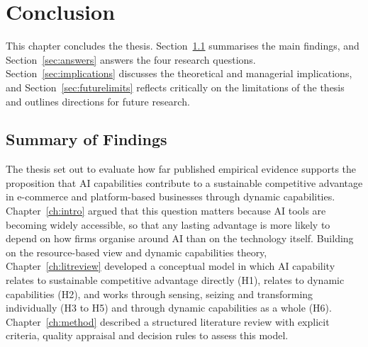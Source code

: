 %

\chapter{Conclusion}
\label{ch:conclusion}

This chapter concludes the thesis. Section~\ref{sec:summary} summarises the main findings, and Section~\ref{sec:answers} answers the four research questions. Section~\ref{sec:implications} discusses the theoretical and managerial implications, and Section~\ref{sec:futurelimits} reflects critically on the limitations of the thesis and outlines directions for future research.

\section{Summary of Findings}
\label{sec:summary}

The thesis set out to evaluate how far published empirical evidence supports the proposition that AI capabilities contribute to a sustainable competitive advantage in e-commerce and platform-based businesses through dynamic capabilities. Chapter~\ref{ch:intro} argued that this question matters because AI tools are becoming widely accessible, so that any lasting advantage is more likely to depend on how firms organise around AI than on the technology itself. Building on the resource-based view and dynamic capabilities theory, Chapter~\ref{ch:litreview} developed a conceptual model in which AI capability relates to sustainable competitive advantage directly (H1), relates to dynamic capabilities (H2), and works through sensing, seizing and transforming individually (H3 to H5) and through dynamic capabilities as a whole (H6). Chapter~\ref{ch:method} described a structured literature review with explicit criteria, quality appraisal and decision rules to assess this model.

